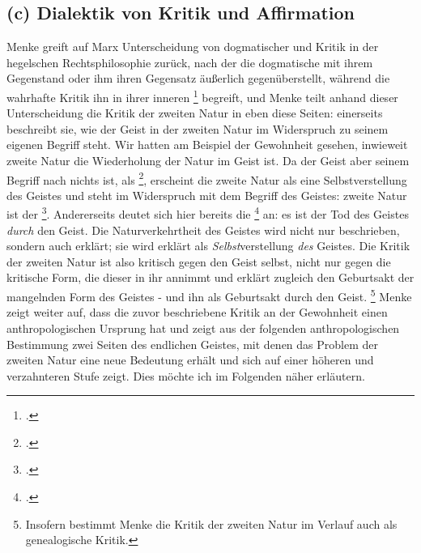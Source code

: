 \documentclass[12pt, a4paper, openany]{report}
\begin{document}
\subsection{(c) Dialektik von Kritik und Affirmation}\label{kritik_affirmation}
Menke greift auf Marx Unterscheidung von dogmatischer und  Kritik in der hegelschen Rechtsphilosophie zurück, nach der die dogmatische mit ihrem Gegenstand  oder ihm ihren Gegensatz äußerlich gegenüberstellt, während die wahrhafte Kritik ihn in ihrer inneren \footcite[][296]{marx_kritik_1977} begreift, und Menke teilt anhand dieser Unterscheidung die Kritik der zweiten Natur in eben diese Seiten:
einerseits beschreibt sie, wie der Geist in der zweiten Natur im Widerspruch zu seinem eigenen Begriff steht.
Wir hatten am Beispiel der Gewohnheit gesehen, inwieweit zweite Natur die Wiederholung der Natur im Geist ist. 
Da der Geist aber seinem Begriff nach nichts ist, als \footcite[][137]{menke_autonomie_2018}, erscheint die zweite Natur als eine Selbstverstellung des Geistes und steht im Widerspruch mit dem Begriff des Geistes:
zweite Natur ist der \footcite[][43]{menke_autonomie_2018}.
Andererseits deutet sich hier bereits die \footcite[][296]{marx_kritik_1977} an:
es ist der Tod des Geistes \emph{durch} den Geist.
Die Naturverkehrtheit des Geistes wird nicht nur beschrieben, sondern auch erklärt;
sie wird erklärt als \emph{Selbst}verstellung \emph{des} Geistes. 
Die Kritik der zweiten Natur ist also kritisch gegen den Geist selbst, nicht nur gegen die kritische Form, die dieser in ihr annimmt und erklärt zugleich den Geburtsakt der mangelnden Form des Geistes - und ihn als Geburtsakt durch den Geist.%
\footnote{
    Insofern bestimmt Menke die Kritik der zweiten Natur im Verlauf auch als genealogische Kritik.
}
Menke zeigt weiter auf, dass die zuvor beschriebene Kritik an der Gewohnheit einen anthropologischen Ursprung hat und zeigt aus der folgenden anthropologischen Bestimmung zwei Seiten des endlichen Geistes, mit denen das Problem der zweiten Natur eine neue Bedeutung erhält und sich auf einer höheren und verzahnteren Stufe zeigt. 
Dies möchte ich im Folgenden näher erläutern.\\
\end{document}

